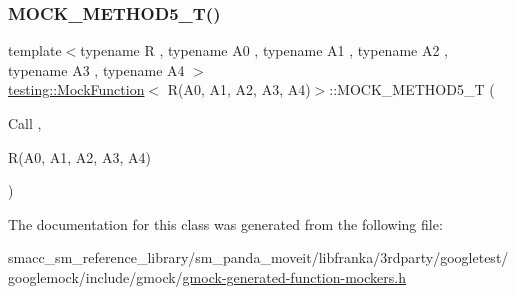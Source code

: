 \subsubsection{\texorpdfstring{M\+O\+C\+K\+\_\+\+M\+E\+T\+H\+O\+D5\+\_\+\+T()}{MOCK\_METHOD5\_T()}}
{\footnotesize\ttfamily template$<$typename R , typename A0 , typename A1 , typename A2 , typename A3 , typename A4 $>$ \\
\hyperlink{classtesting_1_1MockFunction}{testing\+::\+Mock\+Function}$<$ R(A0, A1, A2, A3, A4)$>$\+::M\+O\+C\+K\+\_\+\+M\+E\+T\+H\+O\+D5\+\_\+T (\begin{DoxyParamCaption}\item[{Call}]{,  }\item[{R(A0, A1, A2, A3, A4)}]{ }\end{DoxyParamCaption})}



The documentation for this class was generated from the following file\+:\begin{DoxyCompactItemize}
\item 
smacc\+\_\+sm\+\_\+reference\+\_\+library/sm\+\_\+panda\+\_\+moveit/libfranka/3rdparty/googletest/googlemock/include/gmock/\hyperlink{gmock-generated-function-mockers_8h}{gmock-\/generated-\/function-\/mockers.\+h}\end{DoxyCompactItemize}
